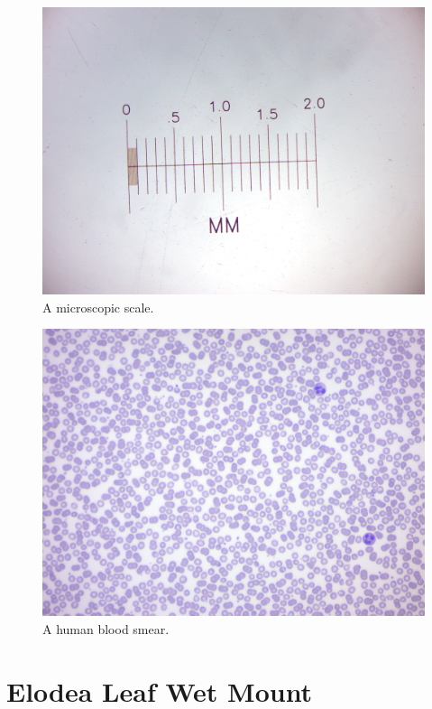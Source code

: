 \begin{figure}

{\centering \includegraphics[width=0.7\linewidth]{./figures/microscope/MM_scale} 

}

\caption{A microscopic scale.}\label{fig:scale}
\end{figure}

\begin{figure}

{\centering \includegraphics[width=0.7\linewidth]{./figures/microscope/Blood_smear} 

}

\caption{A human blood smear.}\label{fig:smear}
\end{figure}

\hypertarget{elodea-leaf-wet-mount}{%
\section{Elodea Leaf Wet Mount}\label{elodea-leaf-wet-mount}}

